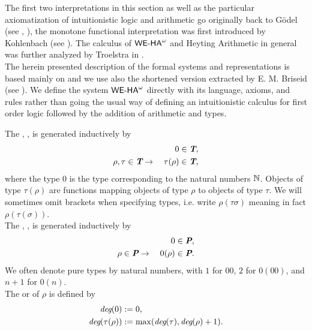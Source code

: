 %
%
%
The first two interpretations in this section as well as the particular 
axiomatization of intuitionistic logic and arithmetic
go originally back to G\"odel (see \cite{Goedel33}, \cite{Goedel58}), 
the monotone functional interpretation was first introduced
by Kohlenbach (see \cite{Kohlenbach96mfi}).
The calculus of ${\textsf{\upshape WE-HA}}^{\omega}$ and Heyting Arithmetic in general was further
analyzed by Troelstra in \cite{Troelstra73}.\\
The herein presented description of the formal systems and representations
is based mainly on \cite{Kohlenbach08} and we use also the shortened version
extracted by E. M. Briseid (see \cite{Briseid05}).
We define the system ${\textsf{\upshape WE-HA}}^{\omega}$ directly
with its language, axioms, and rules rather than going the usual way of
defining an intuitionistic calculus for first order logic
 followed by the addition of arithmetic and
types.
%
%
%
%
\begin{dfn}\label{d:Tp}
The , , is generated
inductively by
\begin{align*}
0 &\in \emph{\protect\textbf{T}} \text{,} \\
\rho,\tau \in  \emph{\protect\textbf{T}} \rightarrow\quad \tau(\rho) &\in  \emph{\protect\textbf{T}}
\text{,}\end{align*} 
where the type $0$ is the type corresponding to the natural numbers $\mathbb{N}$.
Objects of type $\tau(\rho)$ are functions mapping 
objects of type $\rho$ to objects of type $\tau$. We will sometimes 
omit brackets when specifying types, i.e. write $\rho(\tau \sigma)$ 
meaning in fact $\rho(\tau(\sigma))$.\\
The , , is generated
inductively by
\begin{align*}
0 &\in \emph{\protect\textbf{P}} \text{,}\\
\rho \in \emph{\protect\textbf{P}} \rightarrow\quad 0(\rho) &\in  \emph{\protect\textbf{P}} 
\text{.}\end{align*} 
We often denote pure types by natural numbers, with $1$ for
$00$, $2$ for $0(00)$, and $n+1$ for $0(n)$.\\
The  or  of $\rho$ is defined by
\begin{align*}
\emph{deg}(0) &: = 0 \text{,} \\
\emph{deg}(\tau(\rho)) &: = \max (\emph{deg}(\tau), \emph{deg}(\rho)+1)
\text{.}
\end{align*} 
\end{dfn}
